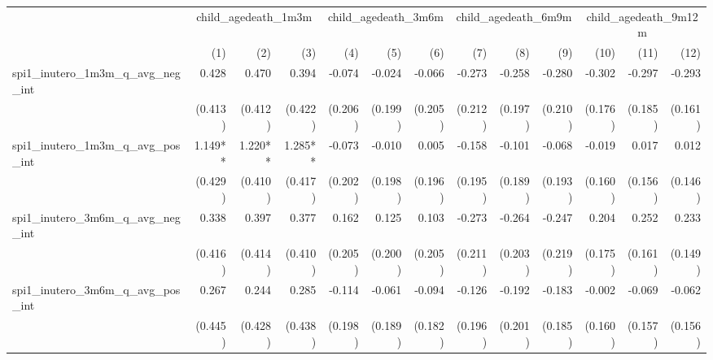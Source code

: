 \begin{tabular}{lrrrrrrrrrrrr}
\toprule
                                            &  \multicolumn{3}{c}{child\_agedeath\_1m3m} &  \multicolumn{3}{c}{child\_agedeath\_3m6m} &  \multicolumn{3}{c}{child\_agedeath\_6m9m} & \multicolumn{3}{c}{child\_agedeath\_9m12m} \\ 
\cmidrule(lr){2-4} \cmidrule(lr){5-7} \cmidrule(lr){8-10} \cmidrule(lr){11-13} 
                                            &          (1) &          (2) &          (3) &          (4) &          (5) &          (6) &          (7) &          (8) &          (9) &         (10) &         (11) &         (12) \\ 
\midrule
spi1\_inutero\_1m3m\_q\_avg\_neg\_int       &        0.428 &        0.470 &        0.394 &       -0.074 &       -0.024 &       -0.066 &       -0.273 &       -0.258 &       -0.280 &       -0.302 &       -0.297 &       -0.293 \\ 
                                            &      (0.413) &      (0.412) &      (0.422) &      (0.206) &      (0.199) &      (0.205) &      (0.212) &      (0.197) &      (0.210) &      (0.176) &      (0.185) &      (0.161) \\ 
spi1\_inutero\_1m3m\_q\_avg\_pos\_int       &      1.149** &      1.220** &      1.285** &       -0.073 &       -0.010 &        0.005 &       -0.158 &       -0.101 &       -0.068 &       -0.019 &        0.017 &        0.012 \\ 
                                            &      (0.429) &      (0.410) &      (0.417) &      (0.202) &      (0.198) &      (0.196) &      (0.195) &      (0.189) &      (0.193) &      (0.160) &      (0.156) &      (0.146) \\ 
spi1\_inutero\_3m6m\_q\_avg\_neg\_int       &        0.338 &        0.397 &        0.377 &        0.162 &        0.125 &        0.103 &       -0.273 &       -0.264 &       -0.247 &        0.204 &        0.252 &        0.233 \\ 
                                            &      (0.416) &      (0.414) &      (0.410) &      (0.205) &      (0.200) &      (0.205) &      (0.211) &      (0.203) &      (0.219) &      (0.175) &      (0.161) &      (0.149) \\ 
spi1\_inutero\_3m6m\_q\_avg\_pos\_int       &        0.267 &        0.244 &        0.285 &       -0.114 &       -0.061 &       -0.094 &       -0.126 &       -0.192 &       -0.183 &       -0.002 &       -0.069 &       -0.062 \\ 
                                            &      (0.445) &      (0.428) &      (0.438) &      (0.198) &      (0.189) &      (0.182) &      (0.196) &      (0.201) &      (0.185) &      (0.160) &      (0.157) &      (0.156) \\ 

\end{tabular}
